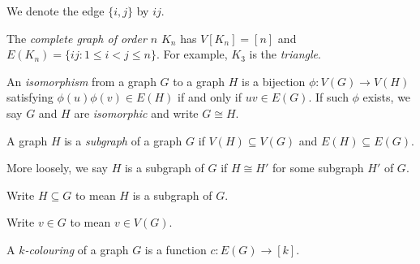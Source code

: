 \documentclass[a4paper]{article}
\begin{document}
\begin{notation}
  We denote the edge \(\{i, j\}\) by \(ij\).
\end{notation}

\begin{eg}
  The \emph{complete graph of order \(n\)} \(K_n\) has \(V[K_n] = [n]\) and \(E(K_n) = \{ij: 1 \leq i < j \leq n\}\). For example, \(K_3\) is the \emph{triangle}.
  \begin{center}

  \end{center}
\end{eg}

\begin{definition}[isomorphism]
  An \emph{isomorphism} from a graph \(G\) to a graph \(H\) is a bijection \(\phi: V(G) \to V(H)\) satisfying \(\phi(u) \phi(v) \in E(H)\) if and only if \(uv \in E(G)\). If such \(\phi\) exists, we say \(G\) and \(H\) are \emph{isomorphic} and write \(G \cong H\).
\end{definition}

\begin{definition}[subgraph]
  A graph \(H\) is a \emph{subgraph} of a graph \(G\) if \(V(H) \subseteq V(G)\) and \(E(H) \subseteq E(G)\).

  More loosely, we say \(H\) is a subgraph of \(G\) if \(H \cong H'\) for some subgraph \(H'\) of \(G\).

  Write \(H \subseteq G\) to mean \(H\) is a subgraph of \(G\).
\end{definition}

\begin{notation}
  Write \(v \in G\) to mean \(v \in V(G)\).
\end{notation}

\begin{definition}[colouring]
  A \emph{\(k\)-colouring} of a graph \(G\) is a function \(c: E(G) \to [k]\).
\end{definition}
\end{document}
